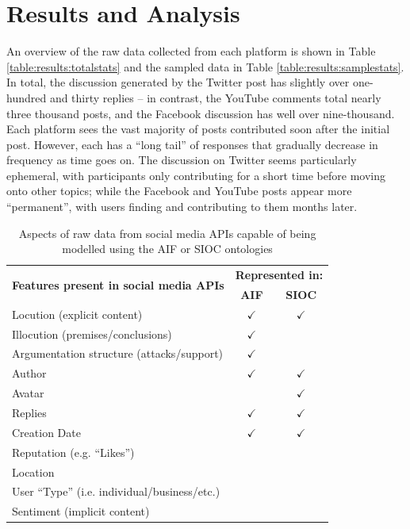 \section{Results and Analysis}
\label{investigation:results}
An overview of the raw data collected from each platform is shown in Table \ref{table:results:totalstats} and the sampled data in Table \ref{table:results:samplestats}. In total, the discussion generated by the Twitter post has slightly over one-hundred and thirty replies -- in contrast, the  YouTube comments total nearly three thousand posts, and the Facebook discussion has well over nine-thousand. Each platform sees the vast majority of posts contributed soon after the initial post. However, each has a ``long tail'' of responses that gradually decrease in frequency as time goes on. The discussion on Twitter seems particularly ephemeral, with participants only contributing for a short time before moving onto other topics; while the Facebook and YouTube posts appear more ``permanent'', with users finding and contributing to them months later.

\begin{table}
\centering
\caption{Aspects of raw data from social media APIs capable of being modelled using the AIF or SIOC ontologies}
\label{table:method:features}
\begin{tabular}{| l | c | c |}
\hline
\multirow{2}{*}{\textbf{Features present in social media APIs}} & \multicolumn{2}{c|}{\textbf{Represented in:}}\\
\cline{2-3}
 & \textbf{AIF} & \textbf{SIOC} \\
\hline
Locution (explicit content)& $\checkmark$ & $\checkmark$ \\
\hline
Illocution (premises/conclusions) & $\checkmark$ & \\
\hline
Argumentation structure (attacks/support) & $\checkmark$ & \\
\hline
Author  		& $\checkmark$ & $\checkmark$ \\
\hline
Avatar  		&  			   & $\checkmark$ \\
\hline
Replies 		& $\checkmark$ & $\checkmark$ \\
\hline
Creation Date  	& $\checkmark$ & $\checkmark$ \\
\hline
Reputation (e.g. ``Likes'')  &  &  \\
\hline
Location  &  &  \\
\hline
User ``Type'' (i.e. individual/business/etc.)  &  &  \\
\hline
Sentiment (implicit content) &  &  \\
\hline
\end{tabular}
\end{table}

